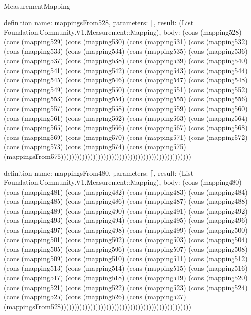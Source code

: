 \begin{lexlean}{MeasurementMapping}
\begin{semanticmodule}
definition{
  name: mappingsFrom528,
  parameters: [],
  result: (List Foundation.Community.V1.Measurement::Mapping),
  body: (cons (mapping528) (cons (mapping529) (cons (mapping530) (cons (mapping531) (cons (mapping532) (cons (mapping533) (cons (mapping534) (cons (mapping535) (cons (mapping536) (cons (mapping537) (cons (mapping538) (cons (mapping539) (cons (mapping540) (cons (mapping541) (cons (mapping542) (cons (mapping543) (cons (mapping544) (cons (mapping545) (cons (mapping546) (cons (mapping547) (cons (mapping548) (cons (mapping549) (cons (mapping550) (cons (mapping551) (cons (mapping552) (cons (mapping553) (cons (mapping554) (cons (mapping555) (cons (mapping556) (cons (mapping557) (cons (mapping558) (cons (mapping559) (cons (mapping560) (cons (mapping561) (cons (mapping562) (cons (mapping563) (cons (mapping564) (cons (mapping565) (cons (mapping566) (cons (mapping567) (cons (mapping568) (cons (mapping569) (cons (mapping570) (cons (mapping571) (cons (mapping572) (cons (mapping573) (cons (mapping574) (cons (mapping575) (mappingsFrom576)))))))))))))))))))))))))))))))))))))))))))))))))
}

definition{
  name: mappingsFrom480,
  parameters: [],
  result: (List Foundation.Community.V1.Measurement::Mapping),
  body: (cons (mapping480) (cons (mapping481) (cons (mapping482) (cons (mapping483) (cons (mapping484) (cons (mapping485) (cons (mapping486) (cons (mapping487) (cons (mapping488) (cons (mapping489) (cons (mapping490) (cons (mapping491) (cons (mapping492) (cons (mapping493) (cons (mapping494) (cons (mapping495) (cons (mapping496) (cons (mapping497) (cons (mapping498) (cons (mapping499) (cons (mapping500) (cons (mapping501) (cons (mapping502) (cons (mapping503) (cons (mapping504) (cons (mapping505) (cons (mapping506) (cons (mapping507) (cons (mapping508) (cons (mapping509) (cons (mapping510) (cons (mapping511) (cons (mapping512) (cons (mapping513) (cons (mapping514) (cons (mapping515) (cons (mapping516) (cons (mapping517) (cons (mapping518) (cons (mapping519) (cons (mapping520) (cons (mapping521) (cons (mapping522) (cons (mapping523) (cons (mapping524) (cons (mapping525) (cons (mapping526) (cons (mapping527) (mappingsFrom528)))))))))))))))))))))))))))))))))))))))))))))))))
}


\end{semanticmodule}
\end{lexlean}
